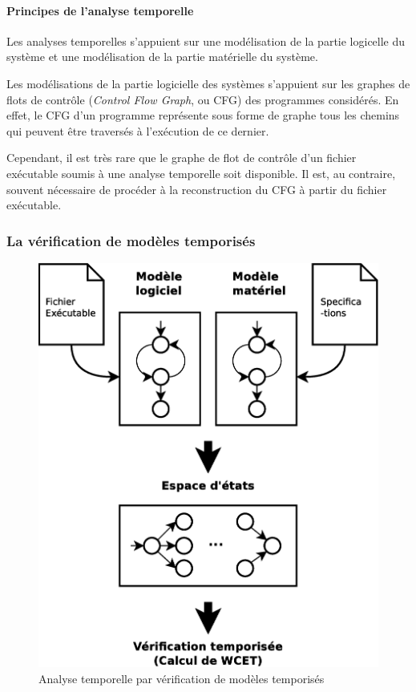       \paragraph{Principes de l'analyse temporelle}
      { Les analyses temporelles s'appuient sur une modélisation de la partie
        logicelle du système et une modélisation de la partie matérielle du
        système.


        Les modélisations de la partie logicielle des systèmes s'appuient sur
        les graphes de flots de contrôle (\textit{Control Flow Graph}, ou CFG)
        des programmes considérés. En effet, le CFG d'un programme représente sous forme
        de graphe tous les chemins qui peuvent être traversés à l'exécution de
        ce dernier.

        Cependant, il est très rare que le graphe de flot de contrôle d'un
        fichier exécutable soumis à une analyse temporelle soit disponible. Il
        est, au contraire, souvent nécessaire de procéder à la reconstruction du
        CFG à partir du fichier exécutable. }
  
    \subsubsection{La vérification de modèles temporisés}

      \begin{figure}
        \centering
        \includegraphics[scale=0.3]{intro.eps}
        \caption{Analyse temporelle par vérification de modèles temporisés}
        \label{fig:intro}
      \end{figure}

